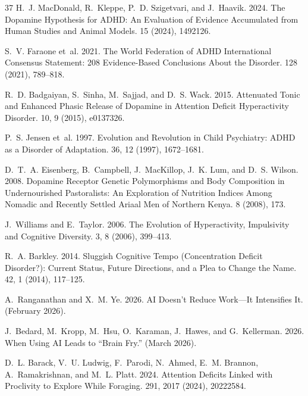 \documentclass[sigconf,nonacm]{acmart}
\begin{document}
\begin{thebibliography}{37}
H.~J. MacDonald, R.~Kleppe, P.~D. Szigetvari, and J.~Haavik. 2024.
\newblock The Dopamine Hypothesis for ADHD: An Evaluation of Evidence Accumulated from Human Studies and Animal Models.
 15 (2024), 1492126.

S.~V. Faraone et~al. 2021.
\newblock The World Federation of ADHD International Consensus Statement: 208 Evidence-Based Conclusions About the Disorder.
 128 (2021), 789--818.

R.~D. Badgaiyan, S.~Sinha, M.~Sajjad, and D.~S. Wack. 2015.
\newblock Attenuated Tonic and Enhanced Phasic Release of Dopamine in Attention Deficit Hyperactivity Disorder.
 10, 9 (2015), e0137326.

P.~S. Jensen et~al. 1997.
\newblock Evolution and Revolution in Child Psychiatry: ADHD as a Disorder of Adaptation.
 36, 12 (1997), 1672--1681.

D.~T.~A. Eisenberg, B.~Campbell, J.~MacKillop, J.~K. Lum, and D.~S. Wilson. 2008.
\newblock Dopamine Receptor Genetic Polymorphisms and Body Composition in Undernourished Pastoralists: An Exploration of Nutrition Indices Among Nomadic and Recently Settled Ariaal Men of Northern Kenya.
 8 (2008), 173.

J.~Williams and E.~Taylor. 2006.
\newblock The Evolution of Hyperactivity, Impulsivity and Cognitive Diversity.
 3, 8 (2006), 399--413.

R.~A. Barkley. 2014.
\newblock Sluggish Cognitive Tempo (Concentration Deficit Disorder?): Current Status, Future Directions, and a Plea to Change the Name.
 42, 1 (2014), 117--125.

A.~Ranganathan and X.~M. Ye. 2026.
\newblock AI Doesn't Reduce Work---It Intensifies It.
 (February 2026).

J.~Bedard, M.~Kropp, M.~Hsu, O.~Karaman, J.~Hawes, and G.~Kellerman. 2026.
\newblock When Using AI Leads to ``Brain Fry.''
 (March 2026).

D.~L. Barack, V.~U. Ludwig, F.~Parodi, N.~Ahmed, E.~M. Brannon, A.~Ramakrishnan, and M.~L. Platt. 2024.
\newblock Attention Deficits Linked with Proclivity to Explore While Foraging.
 291, 2017 (2024), 20222584.


\end{thebibliography}
\end{document}
